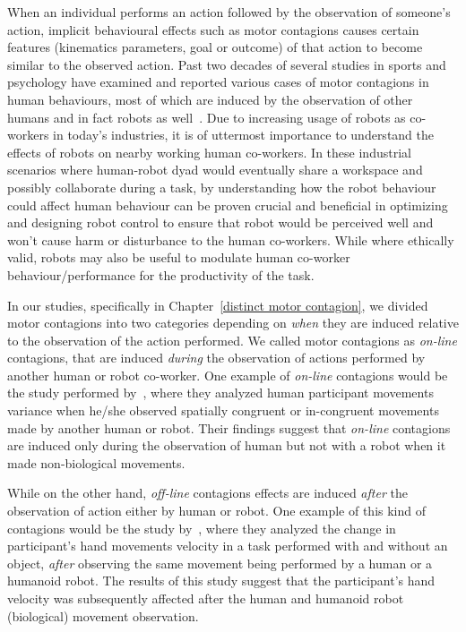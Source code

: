 When an individual performs an action followed by the observation of someone's action, implicit behavioural effects such as motor contagions causes certain features (kinematics parameters, goal or outcome) of that action to become similar to the observed action. Past two decades of several studies in sports and psychology have examined and reported various cases of motor contagions in human behaviours, most of which are induced by the observation of other humans and in fact robots as well~\cite{Becchio:BJN:2007, Hillebrandt:SciReports:2014, Chaminade:BRB:2008, Blakemore:Neuropsychologia:2005, Fadiga:JNeuroPhys:1995, Ganesh:Springer:2015, Sciutti:IJSR:2012, Prinz:EJPAP:1997, edwards2003motor, gray2011hitting}. Due to increasing usage of robots as co-workers in today's industries, it is of uttermost importance to understand the effects of robots on nearby working human co-workers. In these industrial scenarios where human-robot dyad would eventually share a workspace and possibly collaborate during a task, by understanding how the robot behaviour could affect human behaviour can be proven crucial and beneficial in optimizing and designing robot control to ensure that robot would be perceived well and won't cause harm or disturbance to the human co-workers. While where ethically valid, robots may also be useful to modulate human co-worker behaviour/performance for the productivity of the task.

In our studies, specifically in Chapter~\ref{distinct motor contagion}, we divided motor contagions into two categories depending on \textit{when} they are induced relative to the observation of the action performed. We called motor contagions as \textit{on-line} contagions, that are induced \textit{during} the observation of actions performed by another human or robot co-worker. One example of \textit{on-line} contagions would be the study performed by~\cite{Kilner:CurBio:2003}, where they analyzed human participant movements variance when he/she observed spatially congruent or in-congruent movements made by another human or robot. Their findings suggest that \textit{on-line} contagions are induced only during the observation of human but not with a robot when it made non-biological movements.

While on the other hand, \textit{off-line} contagions effects are induced \textit{after} the observation of action either by human or robot. One example of this kind of contagions would be the study by~\cite{Bisio:PlosOne:2014}, where they analyzed the change in participant's hand movements velocity in a task performed with and without an object, \textit{after} observing the same movement being performed by a human or a humanoid robot. The results of this study suggest that the participant's hand velocity was subsequently affected after the human and humanoid robot (biological) movement observation.  

